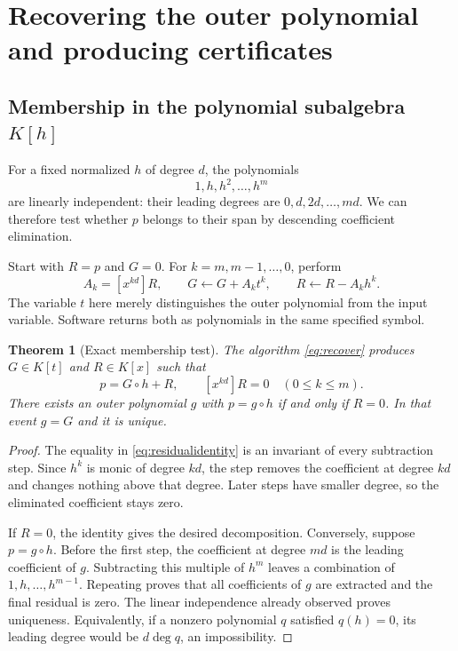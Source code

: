 \documentclass[11pt,a4paper]{article}
\newtheorem{theorem}{Theorem}[section]
\theoremstyle{definition}
\begin{document}
\section{Recovering the outer polynomial and producing certificates}
\subsection{Membership in the polynomial subalgebra \texorpdfstring{$K[h]$}{K[h]}}
For a fixed normalized $h$ of degree $d$, the polynomials
\[
 1,h,h^2,\ldots,h^m
\]
are linearly independent: their leading degrees are $0,d,2d,\ldots,md$. We can therefore test whether $p$ belongs to their span by descending coefficient elimination.

Start with $R=p$ and $G=0$. For $k=m,m-1,\ldots,0$, perform
\begin{equation}
 A_k=[x^{kd}]R,\qquad G\leftarrow G+A_kt^k,
 \qquad R\leftarrow R-A_k h^k.\label{eq:recover}
\end{equation}
The variable $t$ here merely distinguishes the outer polynomial from the input variable. Software returns both as polynomials in the same specified symbol.

\begin{theorem}[Exact membership test]\label{thm:membership}
The algorithm \eqref{eq:recover} produces $G\in K[t]$ and $R\in K[x]$ such that
\begin{equation}
 p=G\circ h+R,\qquad [x^{kd}]R=0\quad(0\le k\le m).\label{eq:residualidentity}
\end{equation}
There exists an outer polynomial $g$ with $p=g\circ h$ if and only if $R=0$. In that event $g=G$ and it is unique.
\end{theorem}
\begin{proof}
The equality in \eqref{eq:residualidentity} is an invariant of every subtraction step. Since $h^k$ is monic of degree $kd$, the step removes the coefficient at degree $kd$ and changes nothing above that degree. Later steps have smaller degree, so the eliminated coefficient stays zero.

If $R=0$, the identity gives the desired decomposition. Conversely, suppose $p=g\circ h$. Before the first step, the coefficient at degree $md$ is the leading coefficient of $g$. Subtracting this multiple of $h^m$ leaves a combination of $1,h,\ldots,h^{m-1}$. Repeating proves that all coefficients of $g$ are extracted and the final residual is zero. The linear independence already observed proves uniqueness. Equivalently, if a nonzero polynomial $q$ satisfied $q(h)=0$, its leading degree would be $d\deg q$, an impossibility.
\end{proof}
\end{document}
